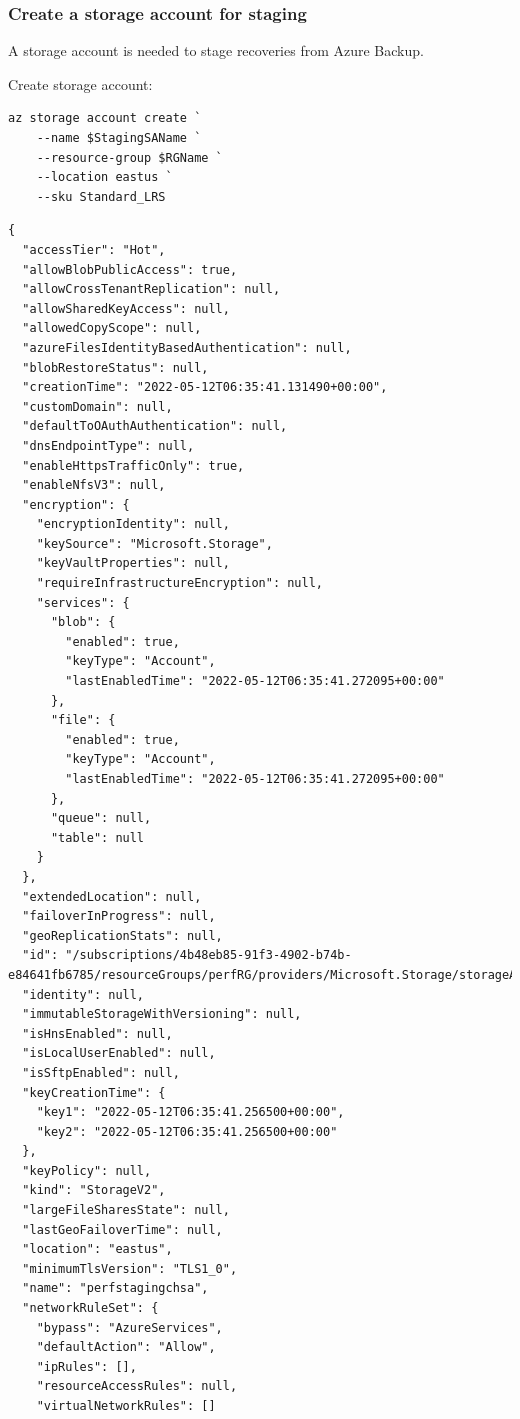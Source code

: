 \subsubsection{Create a storage account for staging}
\label{sec:orgdb0da58}
A storage account is needed to stage recoveries from Azure Backup.

Create storage account:
\begin{verbatim}
az storage account create `
    --name $StagingSAName `
    --resource-group $RGName `
    --location eastus `
    --sku Standard_LRS
\end{verbatim}

\begin{verbatim}
{
  "accessTier": "Hot",
  "allowBlobPublicAccess": true,
  "allowCrossTenantReplication": null,
  "allowSharedKeyAccess": null,
  "allowedCopyScope": null,
  "azureFilesIdentityBasedAuthentication": null,
  "blobRestoreStatus": null,
  "creationTime": "2022-05-12T06:35:41.131490+00:00",
  "customDomain": null,
  "defaultToOAuthAuthentication": null,
  "dnsEndpointType": null,
  "enableHttpsTrafficOnly": true,
  "enableNfsV3": null,
  "encryption": {
    "encryptionIdentity": null,
    "keySource": "Microsoft.Storage",
    "keyVaultProperties": null,
    "requireInfrastructureEncryption": null,
    "services": {
      "blob": {
        "enabled": true,
        "keyType": "Account",
        "lastEnabledTime": "2022-05-12T06:35:41.272095+00:00"
      },
      "file": {
        "enabled": true,
        "keyType": "Account",
        "lastEnabledTime": "2022-05-12T06:35:41.272095+00:00"
      },
      "queue": null,
      "table": null
    }
  },
  "extendedLocation": null,
  "failoverInProgress": null,
  "geoReplicationStats": null,
  "id": "/subscriptions/4b48eb85-91f3-4902-b74b-e84641fb6785/resourceGroups/perfRG/providers/Microsoft.Storage/storageAccounts/perfstagingchsa",
  "identity": null,
  "immutableStorageWithVersioning": null,
  "isHnsEnabled": null,
  "isLocalUserEnabled": null,
  "isSftpEnabled": null,
  "keyCreationTime": {
    "key1": "2022-05-12T06:35:41.256500+00:00",
    "key2": "2022-05-12T06:35:41.256500+00:00"
  },
  "keyPolicy": null,
  "kind": "StorageV2",
  "largeFileSharesState": null,
  "lastGeoFailoverTime": null,
  "location": "eastus",
  "minimumTlsVersion": "TLS1_0",
  "name": "perfstagingchsa",
  "networkRuleSet": {
    "bypass": "AzureServices",
    "defaultAction": "Allow",
    "ipRules": [],
    "resourceAccessRules": null,
    "virtualNetworkRules": []

\end{verbatim}
